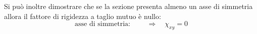 		Si può inoltre dimostrare che se la sezione presenta almeno un asse di simmetria allora il fattore di rigidezza a taglio mutuo è nullo:
		\[ \textrm{asse di simmetria: } \qquad \Rightarrow \quad \chi_{xy} = 0 \]
		
		
		
		
		
		
		
		
		
		
		
		
		
		
		